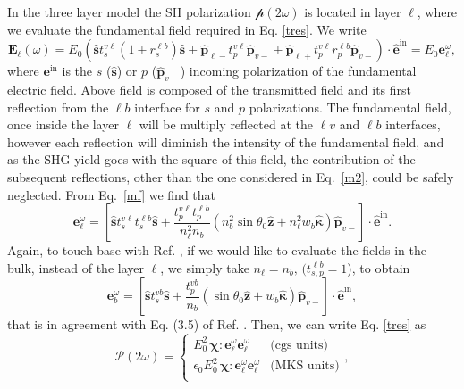 \documentclass[10pt]{book}
\begin{document}
In the three layer model the SH polarization $\boldsymbol{\mathcal{p}}(2\omega)$ is located in layer $\ell$,
where we evaluate the fundamental field required in Eq. \eqref{tres}.
We write
\begin{equation}\label{m2}
\mathbf{E}_{\ell}(\omega)=E_0\left(
\hat{\mathbf{s}} t^{v\ell}_s(1+r^{\ell b}_s)\hat{\mathbf{s}}
+
\hat{\mathbf{p}}_{\ell-}
 t^{v\ell}_{p}
\hat{\mathbf{p}}_{v-}
+
\hat{\mathbf{p}}_{\ell+}
t^{v\ell}_{p}r^{\ell b}_{p}
\hat{\mathbf{p}}_{v-}
\right)\cdot\hat{\mathbf{e}}^{\mathrm{in}}=E_0\mathbf{e}^\omega_{\ell}
,
\end{equation} 
where $\mathbf{e}^{\mathrm{in}}$ is the $s$ ($\hat{\mathbf{s}}$) or $p$
($\hat{\mathbf{p}}_{v-}$)
incoming polarization of
the fundamental electric field. 
Above field is composed of the transmitted field and its first
reflection from the $\ell b$ interface for $s$ and $p$ polarizations.
The fundamental field, once inside the layer $\ell$ will be multiply
reflected at the $\ell v$ and $\ell b$ interfaces, however each
reflection will diminish the intensity of the fundamental field, and as the SHG
yield goes with the square of this field, the contribution of the
subsequent reflections, other than the one considered in
Eq.~\eqref{m2},  could be safely neglected.
From Eq.~\eqref{mf}
we find that
\begin{equation}\label{m12}
\mathbf{e}^{\omega}_{\ell}
= \left[
\hat{\mathbf{s}}t_{s}^{v\ell}t_{s}^{\ell b}\hat{\mathbf{s}} 
+ \frac{t^{v\ell}_{p}t^{\ell b}_{p}}
       {n^2_\ell n_b}
\left(
  n^2_b
\sin\theta_0\hat{\mathbf{z}}
+ n^2_\ell w_b\hat{\boldsymbol{\kappa}}
\right)
\hat{\mathbf{p}}_{v-}
\right]
\cdot\hat{\mathbf{e}}^{\mathrm{in}}.  
\end{equation}  
Again, to touch base with Ref. \cite{mizrahiJOSA88},
if we would like to evaluate the fields in the bulk, instead of the layer
$\ell$, we simply take 
$n_\ell=n_b,\,(t^{\ell b}_{s,p}=1$), to obtain
\begin{equation}\label{m13}
\mathbf{e}^{\omega}_{b}
= \left[
\hat{\mathbf{s}}t_{s}^{vb}\hat{\mathbf{s}}
+ \frac{t^{vb}_{p}}{n_b}
\left(
\sin\theta_0\hat{\mathbf{z}} + w_b\hat{\boldsymbol{\kappa}}
\right) 
\hat{\mathbf{p}}_{v-}
\right]
\cdot\hat{\mathbf{e}}^{\mathrm{in}},  
\end{equation} 
that is in agreement with Eq. (3.5) of Ref. \cite{mizrahiJOSA88}.
Then,
 we can write Eq. \eqref{tres} as
\begin{equation}\label{m4}
\boldsymbol{\mathcal{P}}(2\omega) = 
\left\{
\begin{array}{cc}  
E^{2}_{0}\,\boldsymbol{\chi}:\mathbf{e}^{\omega}_{\ell}\mathbf{e}^{\omega}_{\ell}
& \text{(cgs units)} \\
\epsilon_{0}E^{2}_{0}\,\boldsymbol{\chi}:\mathbf{e}^{\omega}_{\ell}\mathbf{e}^{\omega}_{\ell}
& \text{(MKS units)} \\
\end{array}
\right.
,
\end{equation}
\end{document}
